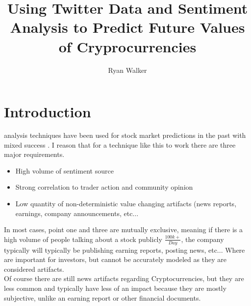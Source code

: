 \documentclass[12pt,journal,compsoc]{IEEEtran}
\begin{document}
\title{Using Twitter Data and Sentiment Analysis to Predict Future Values of Cryprocurrencies}

\author{Ryan Walker}



\maketitle
\IEEEpeerreviewmaketitle

\section{Introduction}
 analysis techniques have been used for stock market predictions in the past  with 
mixed success \cite{BI1}. I reason that for a technique like this to work there are three major requirements.

\begin{itemize}
\item High volume of sentiment source
\item Strong correlation to trader action and community opinion
\item Low quantity of non-deterministic value changing artifacts (news reports, earnings, company announcements, etc...
\end{itemize}

In most cases, point one and three are mutually exclusive, meaning if there is a high volume of people talking about a
stock publicly $\frac{100k+}{Day}$, the company typically will typically be publishing earning reports, posting news, etc... 
Where are important for investors, but cannot be accurately modeled as they are considered artifacts.\\

Of course there are still news artifacts regarding Cryptocurrencies, but they are less common and typically 
have less of an impact because they are mostly subjective, unlike an earning report or other financial documents.\\
\end{document}
